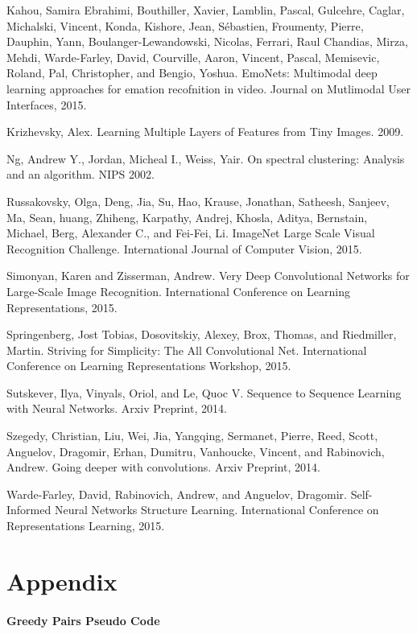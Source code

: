 \documentclass[12pt]{article}
\begin{document}
Kahou, Samira Ebrahimi, Bouthiller, Xavier, Lamblin, Pascal, Gulcehre,
Caglar, Michalski, Vincent, Konda, Kishore, Jean, Sébastien, Froumenty,
Pierre, Dauphin, Yann, Boulanger-Lewandowski, Nicolas, Ferrari, Raul
Chandias, Mirza, Mehdi, Warde-Farley, David, Courville, Aaron, Vincent,
Pascal, Memisevic, Roland, Pal, Christopher, and Bengio, Yoshua.
EmoNets: Multimodal deep learning approaches for emation recofnition in
video. Journal on Mutlimodal User Interfaces, 2015.

Krizhevsky, Alex. Learning Multiple Layers of Features from Tiny Images.
2009.

Ng, Andrew Y., Jordan, Micheal I., Weiss, Yair. On spectral clustering:
Analysis and an algorithm. NIPS 2002.

Russakovsky, Olga, Deng, Jia, Su, Hao, Krause, Jonathan, Satheesh,
Sanjeev, Ma, Sean, huang, Zhiheng, Karpathy, Andrej, Khosla, Aditya,
Bernstain, Michael, Berg, Alexander C., and Fei-Fei, Li. ImageNet Large
Scale Visual Recognition Challenge. International Journal of Computer
Vision, 2015.

Simonyan, Karen and Zisserman, Andrew. Very Deep Convolutional Networks
for Large-Scale Image Recognition. International Conference on Learning
Representations, 2015.

Springenberg, Jost Tobias, Dosovitskiy, Alexey, Brox, Thomas, and
Riedmiller, Martin. Striving for Simplicity: The All Convolutional Net.
International Conference on Learning Representations Workshop, 2015.

Sutskever, Ilya, Vinyals, Oriol, and Le, Quoc V. Sequence to Sequence
Learning with Neural Networks. Arxiv Preprint, 2014.

Szegedy, Christian, Liu, Wei, Jia, Yangqing, Sermanet, Pierre, Reed,
Scott, Anguelov, Dragomir, Erhan, Dumitru, Vanhoucke, Vincent, and
Rabinovich, Andrew. Going deeper with convolutions. Arxiv Preprint,
2014.

Warde-Farley, David, Rabinovich, Andrew, and Anguelov, Dragomir.
Self-Informed Neural Networks Structure Learning. International
Conference on Representations Learning, 2015.

\section{Appendix}\label{appendix}

\paragraph{Greedy Pairs Pseudo Code}\label{greedy-pairs-pseudo-code}
\end{document}
